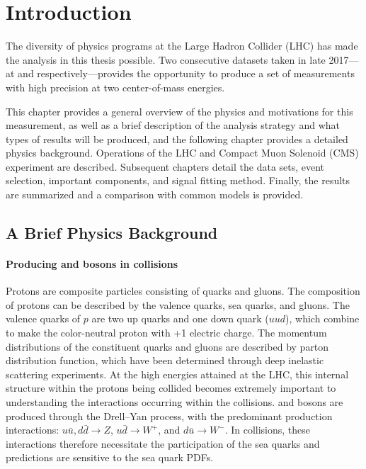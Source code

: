 \chapter{Introduction}

The diversity of physics programs at the Large Hadron Collider (LHC) has made the analysis in this thesis possible. Two consecutive datasets taken in late 2017---at \sg and \sh respectively---provides the opportunity to produce a set of measurements with high precision at two center-of-mass energies.

This chapter provides a general overview of the physics and motivations for this measurement, as well as a brief description of the analysis strategy and what types of results will be produced, and the following chapter provides a detailed physics background. Operations of the LHC and Compact Muon Solenoid (CMS) experiment are described. Subsequent chapters detail the data sets, event selection, important components, and signal fitting method. Finally, the results are summarized and a comparison with common models is provided.


\section{A Brief Physics Background}

\subsubsection{Producing \W and \Z bosons in \pp collisions}
Protons are composite particles consisting of quarks and gluons. The composition of protons can be described by the valence quarks, sea quarks, and gluons. The valence quarks of $p$ are two up quarks and one down quark ($uud$), which combine to make the color-neutral proton with +1 electric charge. The momentum distributions of the constituent quarks and gluons are described by parton distribution function, which have been determined through deep inelastic scattering experiments. At the high energies attained at the LHC, this internal structure within the protons being collided becomes extremely important to understanding the interactions occurring within the \pp collisions. \W and \Z bosons are produced through the Drell--Yan process, with the predominant production interactions: $u\bar{u}, d\bar{d}\rightarrow Z$,  $u\bar{d}\rightarrow W^+$,  and $d\bar{u}\rightarrow W^-$. In \pp collisions, these interactions therefore necessitate the participation of the sea quarks and predictions are sensitive to the sea quark PDFs.

